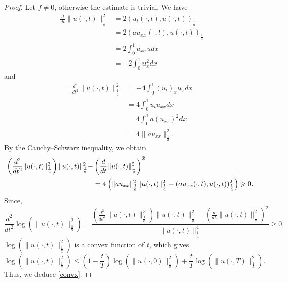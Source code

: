 \documentclass[reqno]{amsart}
\theoremstyle{plain}
\theoremstyle{remark}
\numberwithin{equation}{section}
\begin{document}
\begin{proof} Let $f \neq 0$, otherwise the estimate is trivial.
    We have 
   \begin{equation*}
       \begin{aligned}
       \frac{d}{dt}\|u(\cdot,t)\|_{\frac{1}{a}}^2&=2(u_{t}(\cdot,t),u(\cdot,t))_{\frac{1}{a}}\\&=2(au_{xx}(\cdot,t),u(\cdot,t))_{\frac{1}{a}}\\& =2\int_0^1u_{xx}udx \\&=-2\int_0^1 u_x^2 dx
   \end{aligned}
   \end{equation*}
   and 
 \begin{equation*}
     \begin{aligned}
         \frac{d^2}{dt^2}\|u(\cdot,t)\|_{\frac{1}{a}}^2&=-4\int_0^1 (u_t)_x u_x dx\\&=4 \int_0^1 u_t u_{xx} dx \\&=4 \int_0^1 a(u_{xx})^2 dx\\&= 4\|au_{xx}\|_{\frac{1}{a}}^2.
     \end{aligned}
 \end{equation*}
By the Cauchy–Schwarz inequality, we obtain
 \begin{align*}
    \hspace{-0.15cm} \left( \frac{d^2}{dt^2}\|u(\cdot,t)\|_{\frac{1}{a}}^2\right)\|u(\cdot,t)\|_{\frac{1}{a}}^2-&\left( \frac{d}{dt}\|u(\cdot,t)\|_{\frac{1}{a}}^2\right)^2\\&=4\left(\|au_{xx}\|_{\frac{1}{a}}^2\|u(\cdot,t)\|_{\frac{1}{a}}^2-(au_{xx}(\cdot,t),u(\cdot,t))_{\frac{1}{a}}^2\right)\geqslant 0.
 \end{align*}
 Since,
 $$\frac{d^2}{dt^2}\log\left(\|u(\cdot,t)\|_{\frac{1}{a}}^2\right)=\frac{\left( \frac{d^2}{dt^2}\|u(\cdot,t)\|_{\frac{1}{a}}^2\right)\|u(\cdot,t)\|_{\frac{1}{a}}^2-\left( \frac{d}{dt}\|u(\cdot,t)\|_{\frac{1}{a}}^2\right)^2}{\|u(\cdot,t)\|_{\frac{1}{a}}^4}\geqslant 0,$$
$\log\left(\|u(\cdot,t)\|_{\frac{1}{a}}^2\right)$ is a convex function of $t$, which gives
 $$\log\left(\|u(\cdot,t)\|_{\frac{1}{a}}^2\right)\leqslant \left(1-\frac{t}{T}\right)\log\left(\|u(\cdot,0)\|_{\frac{1}{a}}^2\right)+\frac{t}{T}\log\left(\|u(\cdot,T)\|_{\frac{1}{a}}^2\right).$$
Thus, we deduce \eqref{convx}.
\end{proof}
\end{document}
